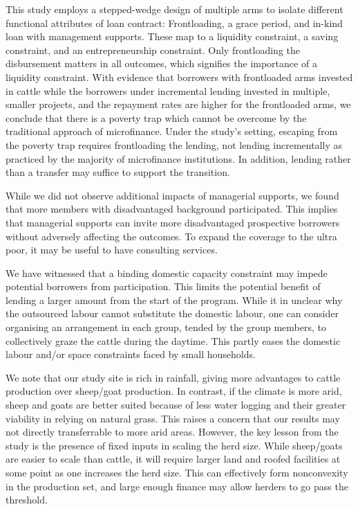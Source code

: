 	This study employs a stepped-wedge design of multiple arms to isolate different functional attributes of loan contract: Frontloading, a grace period, and in-kind loan with management supports. These map to a liquidity constraint, a saving constraint, and an entrepreneurship constraint. Only frontloading the disbursement matters in all outcomes, which signifies the importance of a liquidity constraint. With evidence that borrowers with frontloaded arms invested in cattle while the borrowers under incremental lending invested in multiple, smaller projects, and the repayment rates are higher for the frontloaded arms, we conclude that there is a poverty trap which cannot be overcome by the traditional approach of microfinance. Under the study's setting, escaping from the poverty trap requires frontloading the lending, not lending incrementally as practiced by the majority of microfinance institutions. In addition, lending rather than a transfer may suffice to support the transition. 
	
	While we did not observe additional impacts of managerial supports, we found that more members with disadvantaged background participated. This implies that managerial supports can invite more disadvantaged prospective borrowers without adversely affecting the outcomes. To expand the coverage to the ultra poor, it may be useful to have consulting services.
	
	We have witnessed that a binding domestic capacity constraint may impede potential borrowers from participation. This limits the potential benefit of lending a larger amount from the start of the program. While it in unclear why the outsourced labour cannot substitute the domestic labour, one can consider organising an arrangement in each group, tended by the group members, to collectively graze the cattle during the daytime. This partly eases the domestic labour and/or space constraints faced by small households. 

	We note that our study site is rich in rainfall, giving more advantages to cattle production over sheep/goat production. In contrast, if the climate is more arid, sheep and goats are better suited because of less water logging and their greater viability in relying on natural grass. This raises a concern that our results may not directly transferrable to more arid areas. However, the key lesson from the study is the presence of fixed inputs in scaling the herd size. While sheep/goats are easier to scale than cattle, it will require larger land and roofed facilities at some point as one increases the herd size. This can effectively form nonconvexity in the production set, and large enough finance may allow herders to go pass the threshold. 

